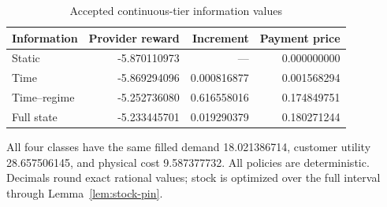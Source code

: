 \begin{table}[!ht]
\centering
\caption{Accepted continuous-tier information values}\label{tab:accepted-hierarchy}
\begin{tabular}{lrrr}\toprule
Information & Provider reward & Increment & Payment price\\
\midrule
Static & -5.870110973 & --- & 0.000000000\\
Time & -5.869294096 & 0.000816877 & 0.001568294\\
Time--regime & -5.252736080 & 0.616558016 & 0.174849751\\
Full state & -5.233445701 & 0.019290379 & 0.180271244\\
\bottomrule\end{tabular}
\par\smallskip\begin{minipage}{.98\textwidth}\small All four classes have the same filled demand 18.021386714, customer utility 28.657506145, and physical cost 9.587377732. All policies are deterministic. Decimals round exact rational values; stock is optimized over the full interval through Lemma~\ref{lem:stock-pin}.\end{minipage}
\end{table}
